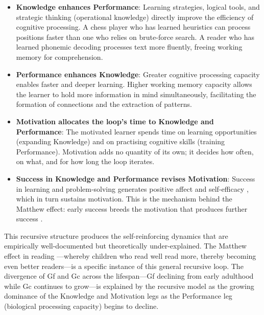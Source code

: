 \documentclass[12pt,a4paper]{article}
\begin{document}
\begin{itemize}
\item \textbf{Knowledge enhances Performance}: Learning strategies, logical tools, and strategic thinking (operational knowledge) directly improve the efficiency of cognitive processing. A chess player who has learned heuristics can process positions faster than one who relies on brute-force search. A reader who has learned phonemic decoding processes text more fluently, freeing working memory for comprehension.

\item \textbf{Performance enhances Knowledge}: Greater cognitive processing capacity enables faster and deeper learning. Higher working memory capacity allows the learner to hold more information in mind simultaneously, facilitating the formation of connections and the extraction of patterns.

\item \textbf{Motivation allocates the loop's time to Knowledge and Performance}: The motivated learner spends time on learning opportunities (expanding Knowledge) and on practising cognitive skills (training Performance). Motivation adds no quantity of its own; it decides how often, on what, and for how long the loop iterates.

\item \textbf{Success in Knowledge and Performance revises Motivation}: Success in learning and problem-solving generates positive affect and self-efficacy \citep{Bandura1997}, which in turn sustains motivation. This is the mechanism behind the Matthew effect: early success breeds the motivation that produces further success \citep{Stanovich1986}.
\end{itemize}

This recursive structure produces the self-reinforcing dynamics that are empirically well-documented but theoretically under-explained. The Matthew effect in reading \citep{Stanovich1986}---\hspace{0pt}whereby children who read well read more, thereby becoming even better readers---\hspace{0pt}is a specific instance of this general recursive loop. The divergence of Gf and Gc across the lifespan---\hspace{0pt}Gf declining from early adulthood while Gc continues to grow---\hspace{0pt}is explained by the recursive model as the growing dominance of the Knowledge and Motivation legs as the Performance leg (biological processing capacity) begins to decline.
\end{document}

